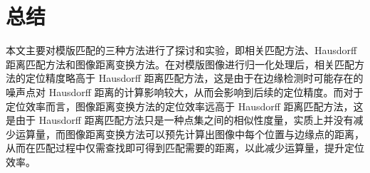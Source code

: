 \section{总结}
本文主要对模版匹配的三种方法进行了探讨和实验，即相关匹配方法、Hausdorff 距离匹配方法和图像距离变换方法。在对模版图像进行归一化处理后，相关匹配方法的定位精度略高于 Hausdorff 距离匹配方法，这是由于在边缘检测时可能存在的噪声点对 Hausdorff 距离的计算影响较大，从而会影响到后续的定位精度。而对于定位效率而言，图像距离变换方法的定位效率远高于 Hausdorff 距离匹配方法，这是由于 Hausdorff 距离匹配方法只是一种点集之间的相似性度量，实质上并没有减少运算量，而图像距离变换方法可以预先计算出图像中每个位置与边缘点的距离，从而在匹配过程中仅需查找即可得到匹配需要的距离，以此减少运算量，提升定位效率。
